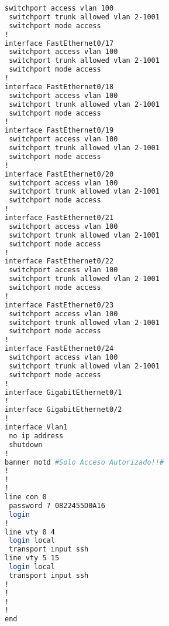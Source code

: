 \begin{lstlisting}[language=Bash, caption={Configuración Completa Switch UCI}]
 switchport access vlan 100
 switchport trunk allowed vlan 2-1001
 switchport mode access
!
interface FastEthernet0/17
 switchport access vlan 100
 switchport trunk allowed vlan 2-1001
 switchport mode access
!
interface FastEthernet0/18
 switchport access vlan 100
 switchport trunk allowed vlan 2-1001
 switchport mode access
!
interface FastEthernet0/19
 switchport access vlan 100
 switchport trunk allowed vlan 2-1001
 switchport mode access
!
interface FastEthernet0/20
 switchport access vlan 100
 switchport trunk allowed vlan 2-1001
 switchport mode access
!
interface FastEthernet0/21
 switchport access vlan 100
 switchport trunk allowed vlan 2-1001
 switchport mode access
!
interface FastEthernet0/22
 switchport access vlan 100
 switchport trunk allowed vlan 2-1001
 switchport mode access
!
interface FastEthernet0/23
 switchport access vlan 100
 switchport trunk allowed vlan 2-1001
 switchport mode access
!
interface FastEthernet0/24
 switchport access vlan 100
 switchport trunk allowed vlan 2-1001
 switchport mode access
!
interface GigabitEthernet0/1
!
interface GigabitEthernet0/2
!
interface Vlan1
 no ip address
 shutdown
!
banner motd #Solo Acceso Autorizado!!#
!
!
!
line con 0
 password 7 0822455D0A16
 login
!
line vty 0 4
 login local
 transport input ssh
line vty 5 15
 login local
 transport input ssh
!
!
!
!
end
\end{lstlisting}
